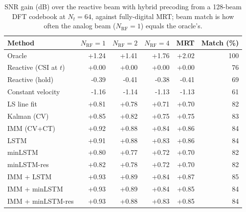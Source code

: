 \begin{table}[t]
\centering
\caption{SNR gain (dB) over the reactive beam with hybrid precoding from a 128-beam DFT codebook at $N_t{=}64$, against fully-digital MRT; beam match is how often the analog beam ($N_{\mathrm{RF}}{=}1$) equals the oracle's.}\label{tab:hybrid128}
\begin{tabular}{lrrrrr}
\toprule
Method & $N_{\mathrm{RF}}{=}1$ & $N_{\mathrm{RF}}{=}2$ & $N_{\mathrm{RF}}{=}4$ & MRT & Match (\%) \\
\midrule
Oracle & +1.24 & +1.41 & +1.76 & +2.02 & 100 \\
Reactive (CSI at $t$) & +0.00 & +0.00 & +0.00 & +0.00 & 76 \\
Reactive (hold) & -0.39 & -0.41 & -0.38 & -0.41 & 69 \\
Constant velocity & -1.16 & -1.14 & -1.13 & -1.13 & 61 \\
LS line fit & +0.81 & +0.78 & +0.71 & +0.70 & 82 \\
Kalman (CV) & +0.85 & +0.82 & +0.75 & +0.75 & 83 \\
IMM (CV+CT) & +0.92 & +0.88 & +0.84 & +0.86 & 84 \\
LSTM & +0.91 & +0.88 & +0.83 & +0.86 & 84 \\
minLSTM & +0.80 & +0.77 & +0.72 & +0.70 & 82 \\
minLSTM-res & +0.82 & +0.78 & +0.72 & +0.70 & 82 \\
IMM + LSTM & +0.93 & +0.89 & +0.84 & +0.87 & 85 \\
IMM + minLSTM & +0.93 & +0.89 & +0.84 & +0.85 & 84 \\
IMM + minLSTM-res & +0.93 & +0.88 & +0.83 & +0.85 & 84 \\
\bottomrule
\end{tabular}
\end{table}

